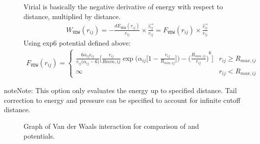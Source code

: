 \documentclass[letterpaper,10pt,english]{sphinxmanual}
\begin{document}
\begin{description}
\item[{}] \leavevmode
Virial is basically the negative derivative of energy with respect to distance, multiplied by distance.
\begin{equation*}
\begin{split}W_{\texttt{VDW}}(r_{ij}) = -\frac{dE_{\texttt{VDW}}(r_{ij})}{r_{ij}}\times \frac{\overrightarrow{r_{ij}}}{{r_{ij}}} = F_{\texttt{VDW}}(r_{ij}) \times \frac{\overrightarrow{r_{ij}}}{{r_{ij}}}\end{split}
\end{equation*}
Using exp\sphinxhyphen{}6 potential defined above:
\begin{equation*}
\begin{split}F_{\texttt{VDW}}(r_{ij}) =
\begin{cases}
  \frac{6 \alpha_{ij}\epsilon_{ij}}{r_{ij}\big(\alpha_{ij}-6\big)} \bigg[\frac{r_{ij}}{R{min,ij}} \exp\bigg(\alpha_{ij} \bigg[1-\frac{r_{ij}}{R_{min,ij}} \bigg]\bigg) - {\bigg(\frac{R_{min,ij}}{r_{ij}}\bigg)}^6 \bigg] &  r_{ij} \geq R_{max,ij} \\
  \infty & r_{ij} < R_{max,ij}
\end{cases}\end{split}
\end{equation*}
\end{description}

\begin{sphinxadmonition}{note}{Note:}
This option only evaluates the energy up to specified  distance. Tail correction to energy and pressure can be specified to account for infinite cutoff distance.
\end{sphinxadmonition}

\begin{figure}[htbp]
\centering
\capstart

\noindent{}
\caption{Graph of Van der Waals interaction for comparison of  and  potentials.}\label{\detokenize{vdw_energy:id1}}\end{figure}
\end{document}
